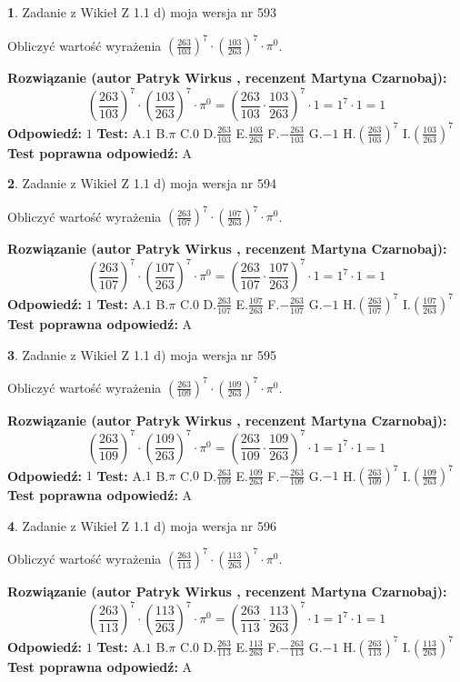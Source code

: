 \documentclass[12pt, a4paper]{article}
\theoremstyle{definition} %
\newtheorem{zad}{}
\newcommand{\zadStart}[1]{\begin{zad}#1\newline}
\newcommand{\zadStop}{\end{zad}}
\newcommand{\rozwStart}[2]{\noindent \textbf{Rozwiązanie (autor #1 , recenzent #2): }\newline}
\newcommand{\rozwStop}{\newline}
\newcommand{\odpStart}{\noindent \textbf{Odpowiedź:}\newline}
\newcommand{\odpStop}{\newline}
\newcommand{\testStart}{\noindent \textbf{Test:}\newline}
\newcommand{\testStop}{\newline}
\newcommand{\kluczStart}{\noindent \textbf{Test poprawna odpowiedź:}\newline}
\newcommand{\kluczStop}{\newline}
\begin{document}
\zadStart{Zadanie z Wikieł Z 1.1 d) moja wersja nr 593}

Obliczyć wartość wyrażenia $(\frac{263}{103})^{7} \cdot (\frac{103}{263})^{7} \cdot \pi^{0}$.
\zadStop
\rozwStart{Patryk Wirkus}{Martyna Czarnobaj}
$$(\frac{263}{103})^{7} \cdot (\frac{103}{263})^{7} \cdot \pi^{0} = (\frac{263}{103} \cdot \frac{103}{263})^{7} \cdot 1 = 1^{7} \cdot 1 = 1$$
\rozwStop
\odpStart
$1$
\odpStop
\testStart
A.$1$ B.$\pi$ C.$0$ D.$\frac{263}{103}$ E.$\frac{103}{263}$
F.$-\frac{263}{103}$ G.$-1$
H.$(\frac{263}{103})^{7}$
I.$(\frac{103}{263})^{7}$
\testStop
\kluczStart
A
\kluczStop



\zadStart{Zadanie z Wikieł Z 1.1 d) moja wersja nr 594}

Obliczyć wartość wyrażenia $(\frac{263}{107})^{7} \cdot (\frac{107}{263})^{7} \cdot \pi^{0}$.
\zadStop
\rozwStart{Patryk Wirkus}{Martyna Czarnobaj}
$$(\frac{263}{107})^{7} \cdot (\frac{107}{263})^{7} \cdot \pi^{0} = (\frac{263}{107} \cdot \frac{107}{263})^{7} \cdot 1 = 1^{7} \cdot 1 = 1$$
\rozwStop
\odpStart
$1$
\odpStop
\testStart
A.$1$ B.$\pi$ C.$0$ D.$\frac{263}{107}$ E.$\frac{107}{263}$
F.$-\frac{263}{107}$ G.$-1$
H.$(\frac{263}{107})^{7}$
I.$(\frac{107}{263})^{7}$
\testStop
\kluczStart
A
\kluczStop



\zadStart{Zadanie z Wikieł Z 1.1 d) moja wersja nr 595}

Obliczyć wartość wyrażenia $(\frac{263}{109})^{7} \cdot (\frac{109}{263})^{7} \cdot \pi^{0}$.
\zadStop
\rozwStart{Patryk Wirkus}{Martyna Czarnobaj}
$$(\frac{263}{109})^{7} \cdot (\frac{109}{263})^{7} \cdot \pi^{0} = (\frac{263}{109} \cdot \frac{109}{263})^{7} \cdot 1 = 1^{7} \cdot 1 = 1$$
\rozwStop
\odpStart
$1$
\odpStop
\testStart
A.$1$ B.$\pi$ C.$0$ D.$\frac{263}{109}$ E.$\frac{109}{263}$
F.$-\frac{263}{109}$ G.$-1$
H.$(\frac{263}{109})^{7}$
I.$(\frac{109}{263})^{7}$
\testStop
\kluczStart
A
\kluczStop



\zadStart{Zadanie z Wikieł Z 1.1 d) moja wersja nr 596}

Obliczyć wartość wyrażenia $(\frac{263}{113})^{7} \cdot (\frac{113}{263})^{7} \cdot \pi^{0}$.
\zadStop
\rozwStart{Patryk Wirkus}{Martyna Czarnobaj}
$$(\frac{263}{113})^{7} \cdot (\frac{113}{263})^{7} \cdot \pi^{0} = (\frac{263}{113} \cdot \frac{113}{263})^{7} \cdot 1 = 1^{7} \cdot 1 = 1$$
\rozwStop
\odpStart
$1$
\odpStop
\testStart
A.$1$ B.$\pi$ C.$0$ D.$\frac{263}{113}$ E.$\frac{113}{263}$
F.$-\frac{263}{113}$ G.$-1$
H.$(\frac{263}{113})^{7}$
I.$(\frac{113}{263})^{7}$
\testStop
\kluczStart
A
\kluczStop
\end{document}
